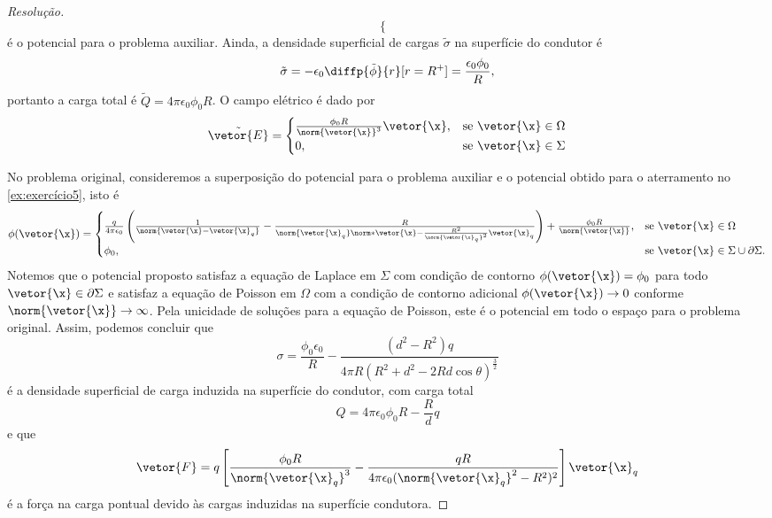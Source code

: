\begin{proof}[Resolução]
\begin{equation*}
\begin{cases}
        \end{cases}
    \end{equation*}
    é o potencial para o problema auxiliar. Ainda, a densidade superficial de cargas \(\tilde{\sigma}\) na superfície do condutor é
    \begin{equation*}
        \tilde{\sigma} = - \epsilon_0\diffp{\tilde{\phi}}{r}[r=R^+] = \frac{\epsilon_0\phi_0}{R},
    \end{equation*}
    portanto a carga total é \(\tilde{Q} = 4\pi \epsilon_0 \phi_0 R\). O campo elétrico é dado por
    \begin{equation*}
        \tilde{\vetor{E}} = \begin{cases}
            \frac{\phi_0 R}{\norm{\vetor{\x}}^3}\vetor{\x},&\text{se }\vetor{\x} \in \Omega\\
            0,&\text{se }\vetor{\x} \in \Sigma
        \end{cases}
    \end{equation*}

    No problema original, consideremos a superposição do potencial para o problema auxiliar e o potencial obtido para o aterramento no \cref{ex:exercício5}, isto é
    \begin{equation*}
        \phi(\vetor{\x}) = \begin{cases}
            \frac{q}{4\pi \epsilon_0} \left(\frac{1}{\norm{\vetor{\x} - \vetor{\x}_q}} - \frac{R}{\norm{\vetor{\x}_q}\norm*{\vetor{\x} - \frac{R^2}{\norm{\vetor{\x}_q}^2}\vetor{\x}_q}}\right) + \frac{\phi_0 R}{\norm{\vetor{\x}}},&\text{se }\vetor{\x} \in \Omega\\
            \phi_0, &\text{se } \vetor{\x}\in \Sigma \cup \partial \Sigma.
        \end{cases}
    \end{equation*}
    Notemos que o potencial proposto satisfaz a equação de Laplace em \(\Sigma\) com condição de contorno \(\phi(\vetor{\x}) = \phi_0\) para todo \(\vetor{\x} \in \partial \Sigma\) e satisfaz a equação de Poisson em \(\Omega\) com a condição de contorno adicional \(\phi(\vetor{\x}) \to 0\) conforme \(\norm{\vetor{\x}} \to \infty\). Pela unicidade de soluções para a equação de Poisson, este é o potencial em todo o espaço para o problema original. Assim, podemos concluir que
    \begin{equation*}
        \sigma = \frac{\phi_0 \epsilon_0}{R}-\frac{(d^2 - R^2)q}{4\pi R(R^2 + d^2 - 2Rd \cos\theta)^{\frac32}}
    \end{equation*}
    é a densidade superficial de carga induzida na superfície do condutor, com carga total
    \begin{equation*}
        Q = 4\pi \epsilon_0 \phi_0 R - \frac{R}{d}q
    \end{equation*}
    e que
    \begin{equation*}
        \vetor{F} = q\left[\frac{\phi_0R}{\norm{\vetor{\x}_q}^3}-\frac{q R}{4\pi \epsilon_0 (\norm{\vetor{\x}_q}^2 - R^2)^2}\right]\vetor{\x}_q
    \end{equation*}
    é a força na carga pontual devido às cargas induzidas na superfície condutora.
\end{proof}
